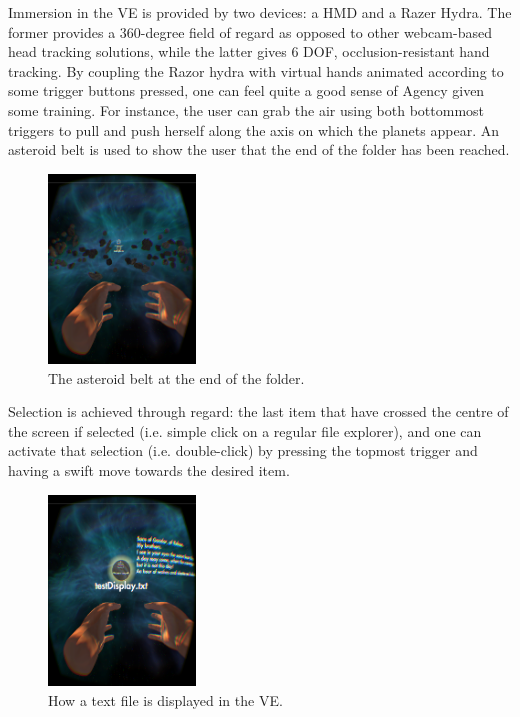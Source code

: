 \documentclass[paper=a4, fontsize=11pt]{scrartcl} %
\numberwithin{equation}{section} %
\numberwithin{figure}{section} %
\numberwithin{table}{section} %
\begin{document}
Immersion in the VE is provided by two devices: a HMD and a Razer Hydra. The former provides a 360-degree field of regard as opposed to other webcam-based head tracking solutions, while the latter gives 6 DOF, occlusion-resistant hand tracking. By coupling the Razor hydra with virtual hands animated according to some trigger buttons pressed, one can feel quite a good sense of Agency given some training. For instance, the user can grab the air using both bottommost triggers to pull and push herself along the axis on which the planets appear. An asteroid belt is used to show the user that the end of the folder has been reached.

\begin{figure}[H]
	\centering
	\includegraphics[width=0.35\textwidth]{asteroids}
	\caption{The asteroid belt at the end of the folder.}
	\label{fig:asteroids}
\end{figure}

Selection is achieved through regard: the last item that have crossed the centre of the screen if selected (i.e. simple click on a regular file explorer), and one can activate that selection (i.e. double-click) by pressing the topmost trigger and having a swift move towards the desired item.

\begin{figure}[H]
	\centering
	\includegraphics[width=0.35\textwidth]{text-display}
	\caption{How a text file is displayed in the VE.}
	\label{fig:textfile}
\end{figure}
\end{document}
